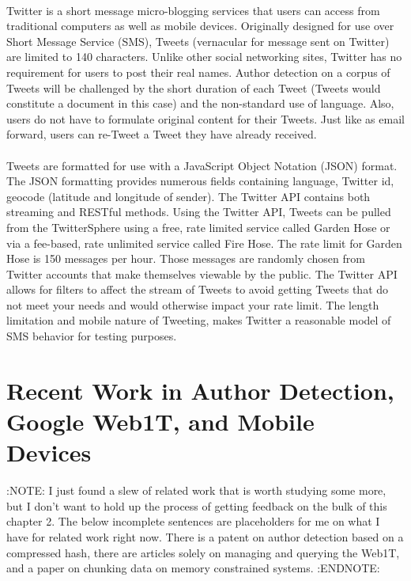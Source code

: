 	\paragraph{} Twitter is a short message micro-blogging services that users can access from traditional computers as well as mobile devices.  Originally designed for use over Short Message Service (SMS), Tweets (vernacular for message sent on Twitter) are limited to 140 characters.  Unlike other social networking sites, Twitter has no requirement for users to post their real names.  Author detection on a corpus of Tweets will be challenged by the short duration of each Tweet (Tweets would constitute a document in this case) and the non-standard use of language.  Also, users do not have to formulate original content for their Tweets.  Just like as email forward, users can re-Tweet a Tweet they have already received.  
	\paragraph{} Tweets are formatted for use with a JavaScript Object Notation (JSON) format. The JSON formatting provides numerous fields containing language, Twitter id, geocode (latitude and longitude of sender).  The Twitter API contains both streaming and RESTful methods.  Using the Twitter API, Tweets can be pulled from the TwitterSphere using a free, rate limited service called Garden Hose or via a fee-based, rate unlimited service called Fire Hose.  The rate limit for Garden Hose is 150 messages per hour.  Those messages are randomly chosen from Twitter accounts that make themselves viewable by the public.  The Twitter API allows for filters to affect the stream of Tweets to avoid getting Tweets that do not meet your needs and would otherwise impact your rate limit.  The length limitation and mobile nature of Tweeting, makes Twitter a reasonable model of SMS behavior for testing purposes.\cite{_streaming_????}

\section{Recent Work in Author Detection, Google Web1T, and Mobile Devices} :NOTE: I just found a slew of related work that is worth studying some more, but I don't want to hold up the process of getting feedback on the bulk of this chapter 2.  The below incomplete sentences are placeholders for me on what I have for related work right now.  There is a patent on author detection based on a compressed hash, there are articles solely on managing and querying the Web1T, and a paper on chunking data on memory constrained systems. :ENDNOTE:
